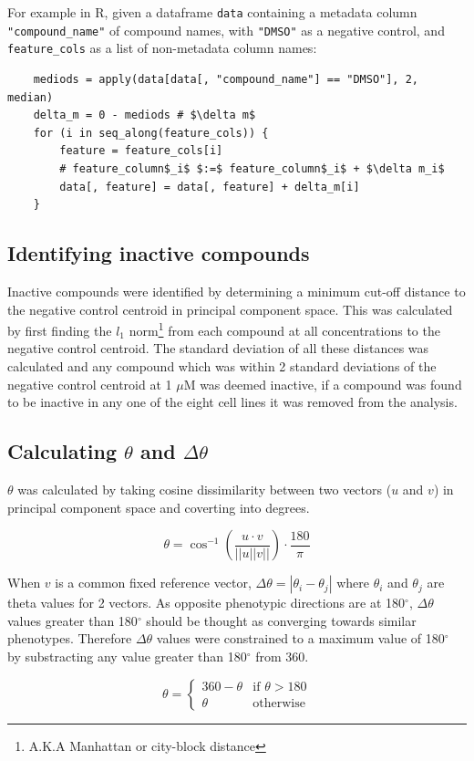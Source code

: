 \documentclass[a4paper,11pt,twoside,openright]{scrbook}
\begin{document}
For example in R, given a dataframe \texttt{data} containing a metadata column \texttt{"compound\_name"} of compound names, with \texttt{"DMSO"} as a negative control, and \texttt{feature\_cols} as a list of non-metadata column names:


\begin{verbatim}
    mediods = apply(data[data[, "compound_name"] == "DMSO"], 2, median)
    delta_m = 0 - mediods # $\delta m$
    for (i in seq_along(feature_cols)) {
        feature = feature_cols[i]
        # feature_column$_i$ $:=$ feature_column$_i$ + $\delta m_i$
        data[, feature] = data[, feature] + delta_m[i]
    }
\end{verbatim}


\subsection{Identifying inactive compounds}

Inactive compounds were identified by determining a minimum cut-off distance to the negative control centroid in principal component space.
This was calculated by first finding the $l_1$ norm\footnote{A.K.A Manhattan or city-block distance} from each compound at all concentrations to the negative control centroid.
The standard deviation of all these distances was calculated and any compound which was within 2 standard deviations of the negative control centroid at 1 $\mu$M was deemed inactive, if a compound was found to be inactive in any one of the eight cell lines it was removed from the analysis.


\subsection{Calculating $\theta$ and $\Delta\theta$}

$\theta$ was calculated by taking cosine dissimilarity between two vectors ($u$ and $v$) in principal component space and coverting into degrees.

\begin{equation} \label{equation:theta}
        \theta = \cos^{-1} \left( \frac{u \cdot v}{||u||v||} \right) \cdot \frac{180}{\pi}
\end{equation}

When $v$ is a common fixed reference vector, $\Delta\theta = |\theta_i - \theta_j|$ where $\theta_i$ and $\theta_j$ are theta values for 2 vectors.
As opposite phenotypic directions are at 180$^\circ$, $\Delta\theta$ values greater than 180$^\circ$ should be thought as converging towards similar phenotypes.
Therefore $\Delta\theta$ values were constrained to a maximum value of 180$^\circ$ by substracting any value greater than 180$^\circ$ from 360.

\begin{equation}
\theta = 
    \begin{cases}
        360 - \theta & \text{if } \theta > 180\\
        \theta       & \text{otherwise}
    \end{cases}
\end{equation}
\end{document}
